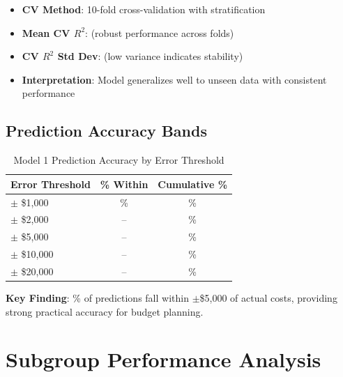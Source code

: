 \begin{itemize}
    \item \textbf{CV Method}: 10-fold cross-validation with stratification
    \item \textbf{Mean CV $R^2$}: \ModelOneCVMean{} (robust performance across folds)
    \item \textbf{CV $R^2$ Std Dev}: \ModelOneCVStd{} (low variance indicates stability)
    \item \textbf{Interpretation}: Model generalizes well to unseen data with consistent performance
\end{itemize}

\subsection{Prediction Accuracy Bands}

\begin{table}[h]
\centering
\caption{Model 1 Prediction Accuracy by Error Threshold}
\begin{tabular}{lcc}
\toprule
\textbf{Error Threshold} & \textbf{\% Within} & \textbf{Cumulative \%} \\
\midrule
$\pm$ \$1,000 & \ModelOneWithinOneK{}\% & \ModelOneWithinOneK{}\% \\
$\pm$ \$2,000 & -- & \ModelOneWithinTwoK{}\% \\
$\pm$ \$5,000 & -- & \ModelOneWithinFiveK{}\% \\
$\pm$ \$10,000 & -- & \ModelOneWithinTenK{}\% \\
$\pm$ \$20,000 & -- & \ModelOneWithinTwentyK{}\% \\
\bottomrule
\end{tabular}
\end{table}

\textbf{Key Finding}: \ModelOneWithinFiveK{}\% of predictions fall within $\pm$\$5,000 of actual costs, providing strong practical accuracy for budget planning.

\section{Subgroup Performance Analysis}


